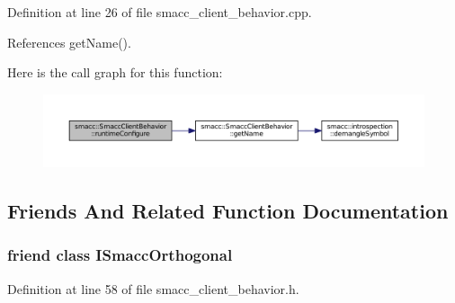 Definition at line 26 of file smacc\+\_\+client\+\_\+behavior.\+cpp.



References get\+Name().




Here is the call graph for this function\+:
\nopagebreak
\begin{figure}[H]
\begin{center}
\leavevmode
\includegraphics[width=350pt]{classsmacc_1_1SmaccClientBehavior_a228b90d814511a24907c5d65553bcba2_cgraph}
\end{center}
\end{figure}




\subsection{Friends And Related Function Documentation}
\subsubsection[{\texorpdfstring{I\+Smacc\+Orthogonal}{ISmaccOrthogonal}}]{\setlength{\rightskip}{0pt plus 5cm}friend class {\bf I\+Smacc\+Orthogonal}\hspace{0.3cm}{\ttfamily [friend]}}\hypertarget{classsmacc_1_1SmaccClientBehavior_a7205cc84a71fea903124d54d01e99a68}{}\label{classsmacc_1_1SmaccClientBehavior_a7205cc84a71fea903124d54d01e99a68}


Definition at line 58 of file smacc\+\_\+client\+\_\+behavior.\+h.

